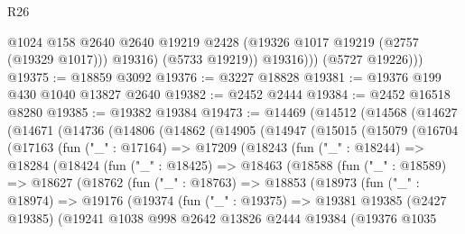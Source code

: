 \begin{lexlean}{R26}
\begin{coremodule}
                  @1024
                  @158
                  @2640
                  @2640
                  @19219
                  @2428
                  (@19326 @1017 @19219 (@2757 (@19329 @1017)))
                  @19316)
                (@5733 @19219))
              @19316)))
        (@5727 @19226)))
@19375 := @18859 @3092
@19376 := @3227 @18828
@19381 := @19376 @199 @430 @1040 @13827 @2640
@19382 := @2452 @2444
@19384 := @2452 @16518 @8280
@19385 := @19382 @19384
@19473 := @14469
    (@14512
      (@14568
        (@14627
          (@14671
            (@14736
              (@14806
                (@14862
                  (@14905
                    (@14947
                      (@15015
                        (@15079
                          (@16704
                            (@17163
                              (fun ("_" : @17164) =>
                              @17209
                                (@18243
                                  (fun ("_" : @18244) =>
                                  @18284
                                    (@18424
                                      (fun ("_" : @18425) =>
                                      @18463
                                        (@18588
                                          (fun ("_" : @18589) =>
                                          @18627
                                            (@18762
                                              (fun ("_" : @18763) =>
                                              @18853
                                                (@18973
                                                  (fun ("_" : @18974) =>
                                                  @19176
                                                    (@19374
                                                      (fun ("_" : @19375) =>
                                                      @19381
                                                        @19385
                                                        (@2427 @19385)
                                                        (@19241
                                                          @1038
                                                          @998
                                                          @2642
                                                          @13826
                                                          @2444
                                                          @19384
                                                          (@19376
                                                            @1035

\end{coremodule}
\end{lexlean}
